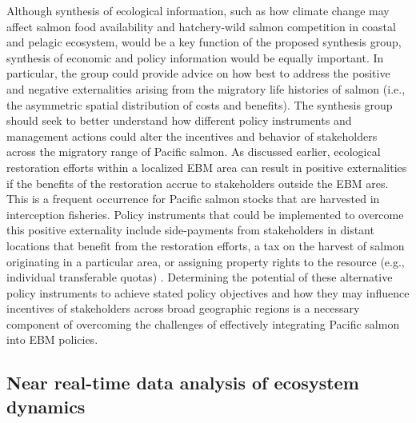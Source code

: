 Although synthesis of ecological information, such as how climate change
may affect salmon food availability and hatchery-wild salmon competition
in coastal and pelagic ecosystem, would be a key function of the
proposed synthesis group, synthesis of economic and policy information
would be equally important. In particular, the group could provide
advice on how best to address the positive and negative externalities
arising from the migratory life histories of salmon (i.e., the
asymmetric spatial distribution of costs and benefits). The synthesis
group should seek to better understand how different policy instruments
and management actions could alter the incentives and behavior of
stakeholders across the migratory range of Pacific salmon. As discussed
earlier, ecological restoration efforts within a localized EBM area can
result in positive externalities if the benefits of the restoration
accrue to stakeholders outside the EBM ares. This is a frequent
occurrence for Pacific salmon stocks that are harvested in interception
fisheries. Policy instruments that could be implemented to overcome this
positive externality include side-payments from stakeholders in distant
locations that benefit from the restoration efforts, a tax on the
harvest of salmon originating in a particular area, or assigning
property rights to the resource (e.g., individual transferable quotas)
\citep{Howlett2009a}. Determining the potential of these alternative
policy instruments to achieve stated policy objectives and how they may
influence incentives of stakeholders across broad geographic regions is
a necessary component of overcoming the challenges of effectively
integrating Pacific salmon into EBM policies.


\subsection{Near real-time data analysis of ecosystem dynamics}


